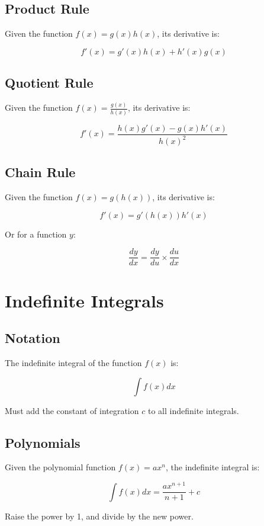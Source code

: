 \documentclass[a4paper,11pt]{article}
\begin{document}
\subsection{Product Rule}

Given the function $f(x) = g(x) h(x)$, its derivative is:

$$
f'(x) = g'(x) h(x) + h'(x) g(x)
$$


\subsection{Quotient Rule}

Given the function $f(x) = \frac{g(x)}{h(x)}$, its derivative is:

$$
f'(x) = \frac{h(x) g'(x) - g(x) h'(x)}{h(x)^2}
$$


\subsection{Chain Rule}

Given the function $f(x) = g(h(x))$, its derivative is:

$$
f'(x) = g'(h(x)) h'(x)
$$

Or for a function $y$:

$$
\frac{dy}{dx} = \frac{dy}{du} \times \frac{du}{dx}
$$




\section{Indefinite Integrals}

\subsection{Notation}

The indefinite integral of the function $f(x)$ is:

$$
\int f(x) dx
$$

Must add the constant of integration $c$ to all indefinite integrals.


\subsection{Polynomials}

Given the polynomial function $f(x) = ax^n$, the indefinite integral is:

$$
\int f(x) dx = \frac{ax^{n + 1}}{n + 1} + c
$$

Raise the power by 1, and divide by the new power.
\end{document}
